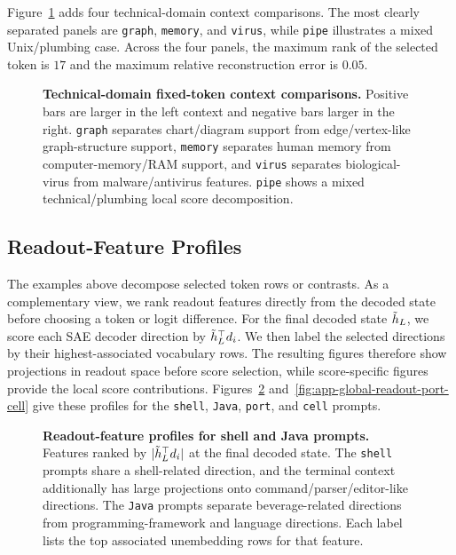 Figure~\ref{fig:app-qwen2b-technical-domain-delta} adds four technical-domain
context comparisons. The most clearly separated panels are \texttt{graph},
\texttt{memory}, and \texttt{virus}, while \texttt{pipe} illustrates a mixed
Unix/plumbing case.
Across the four panels, the maximum rank of the selected token is \(17\) and the maximum
relative reconstruction error is \(0.05\).

\begin{figure}[!tbp]
    \centering
    \caption{\textbf{Technical-domain fixed-token context comparisons.}
    Positive bars are larger in the left context and negative bars larger in the
    right. \texttt{graph} separates chart/diagram support from
    edge/vertex-like graph-structure support, \texttt{memory} separates human
    memory from computer-memory/RAM support, and \texttt{virus} separates
    biological-virus from malware/antivirus features. \texttt{pipe}
    shows a mixed technical/plumbing local score decomposition.}
    \label{fig:app-qwen2b-technical-domain-delta}
\end{figure}

\subsection{Readout-Feature Profiles}
\label{app:global-readout-feature-profiles}

The examples above decompose selected token rows or contrasts. As a complementary
view, we rank readout features directly from the decoded state
before choosing a token or logit difference. For the final decoded state
\(\tilde h_L\), we score each SAE decoder direction by
\(\tilde h_L^\top d_i\). We then label
the selected directions by their highest-associated vocabulary rows. The resulting figures
therefore show projections in readout space before score selection, while score-specific
figures provide the local score contributions.
Figures~\ref{fig:app-global-readout-shell-java}
and~\ref{fig:app-global-readout-port-cell} give these profiles for the
\texttt{shell}, \texttt{Java}, \texttt{port}, and \texttt{cell} prompts.

\begin{figure}[!tbp]
    \centering
    \caption{\textbf{Readout-feature profiles for shell and Java prompts.}
    Features ranked by \(|\tilde h_L^\top d_i|\) at the final decoded state. The
    \texttt{shell} prompts share a shell-related direction, and the terminal
    context additionally has large projections onto command/parser/editor-like directions. The
    \texttt{Java} prompts separate beverage-related directions from
    programming-framework and language directions. Each label lists the top
    associated unembedding rows for that feature.}
    \label{fig:app-global-readout-shell-java}
\end{figure}

